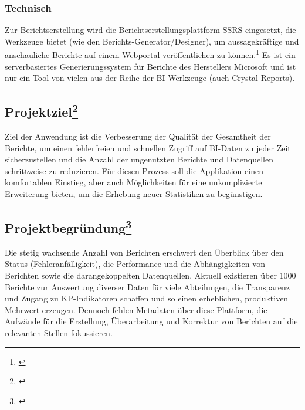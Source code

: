 \subsubsection{Technisch}
\label{sec:Ausgangssituation:Technisch}
Zur Berichtserstellung wird die Berichtserstellungsplattform \ac{SSRS} eingesetzt, die Werkzeuge bietet (wie den Berichts-Generator/Designer), um aussagekräftige und anschauliche Berichte auf einem Webportal veröffentlichen zu können.\footnote{\Vgl \cite{Projektantrag}}
Es ist ein serverbasiertes Generierungssystem für Berichte des Herstellers Microsoft und ist nur ein Tool von vielen aus der Reihe der \ac{BI}-Werkzeuge (\zB auch Crystal Reports).



\subsection[Projektziel]{Projektziel\footnote{\cite{Projektantrag}}}
\label{sec:Projektziel}
\begin{displayquote}
	Ziel der Anwendung ist die Verbesserung der Qualität der Gesamtheit der Berichte, um einen fehlerfreien und schnellen Zugriff auf \ac{BI}-Daten zu jeder Zeit sicherzustellen und die Anzahl der ungenutzten Berichte und Datenquellen schrittweise zu reduzieren. Für diesen Prozess soll die Applikation einen komfortablen Einstieg, aber auch Möglichkeiten für eine unkomplizierte Erweiterung bieten, um \ggfs die Erhebung neuer Statistiken zu begünstigen.
\end{displayquote}


\subsection[Projektbegründung]{Projektbegründung\footnote{\cite{Projektantrag}}}
\label{sec:Projektbegruendung}
\begin{displayquote}
	Die stetig wachsende Anzahl von Berichten erschwert den Überblick über den Status (Fehleranfälligkeit), die Performance und die Abhängigkeiten von Berichten sowie die darangekoppelten Datenquellen. Aktuell existieren über 1000 Berichte zur Auswertung diverser Daten für viele Abteilungen, die \ua Transparenz und Zugang zu \ac{KP}-Indikatoren schaffen und so einen erheblichen, produktiven Mehrwert erzeugen. Dennoch fehlen Metadaten über diese Plattform, die Aufwände für die Erstellung, Überarbeitung und Korrektur von Berichten auf die relevanten Stellen fokussieren.
\end{displayquote}

